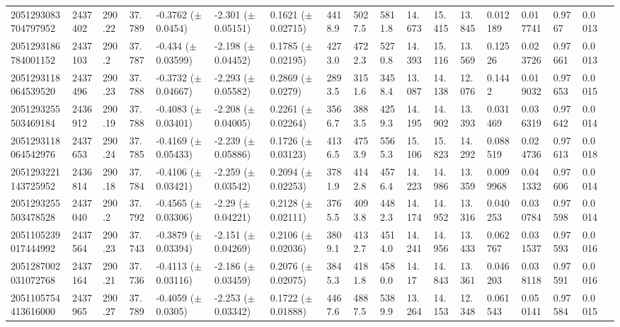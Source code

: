 \begin{sidewaystable}[htbp]
{\begin{tabular}{llllllllllllllllll}
            2051293083704797952 & 2437402 & 290.22 & 37.789 & -0.3762 ($\pm$ 0.0454) & -2.301 ($\pm$ 0.05151) & 0.1621 ($\pm$ 0.02715) & 4418.9 & 5027.5 & 5811.8 & 14.673 & 15.415 & 13.845 & 0.012189 & 0.017741 & 0.9767 & 0.0013 & \\
            2051293186784001152 & 2437103 & 290.2 & 37.787 & -0.434 ($\pm$ 0.03599) & -2.198 ($\pm$ 0.04452) & 0.1785 ($\pm$ 0.02195) & 4273.0 & 4722.3 & 5270.8 & 14.393 & 15.116 & 13.569 & 0.12526 & 0.023726 & 0.97661 & 0.0013 & \\
            2051293118064539520 & 2437496 & 290.23 & 37.788 & -0.3732 ($\pm$ 0.04667) & -2.293 ($\pm$ 0.05582) & 0.2869 ($\pm$ 0.0279) & 2893.5 & 3151.6 & 3458.4 & 13.087 & 14.138 & 12.076 & 0.1442 & 0.019032 & 0.97653 & 0.0015 & \\
            2051293255503469184 & 2436912 & 290.19 & 37.788 & -0.4083 ($\pm$ 0.03401) & -2.208 ($\pm$ 0.04005) & 0.2261 ($\pm$ 0.02264) & 3566.7 & 3883.5 & 4259.3 & 14.195 & 14.902 & 13.393 & 0.031469 & 0.036319 & 0.97642 & 0.0014 & \\
            2051293118064542976 & 2437653 & 290.24 & 37.785 & -0.4169 ($\pm$ 0.05433) & -2.239 ($\pm$ 0.05886) & 0.1726 ($\pm$ 0.03123) & 4136.5 & 4753.9 & 5565.3 & 15.106 & 15.823 & 14.292 & 0.088519 & 0.024736 & 0.97613 & 0.0018 & \\
            2051293221143725952 & 2436814 & 290.18 & 37.784 & -0.4106 ($\pm$ 0.03421) & -2.259 ($\pm$ 0.03542) & 0.2094 ($\pm$ 0.02253) & 3781.9 & 4142.8 & 4576.4 & 14.223 & 14.986 & 13.359 & 0.0099968 & 0.041332 & 0.97606 & 0.0014 & \\
            2051293255503478528 & 2437040 & 290.2 & 37.792 & -0.4565 ($\pm$ 0.03306) & -2.29 ($\pm$ 0.04221) & 0.2128 ($\pm$ 0.02111) & 3765.5 & 4093.8 & 4482.3 & 14.174 & 14.952 & 13.316 & 0.040253 & 0.030784 & 0.97598 & 0.0014 & \\
            2051105239017444992 & 2437564 & 290.23 & 37.743 & -0.3879 ($\pm$ 0.03394) & -2.151 ($\pm$ 0.04269) & 0.2106 ($\pm$ 0.02036) & 3809.1 & 4132.7 & 4514.0 & 14.241 & 14.956 & 13.433 & 0.062767 & 0.031537 & 0.97593 & 0.0016 & \\
            2051287002031072768 & 2437164 & 290.21 & 37.736 & -0.4113 ($\pm$ 0.03116) & -2.186 ($\pm$ 0.03459) & 0.2076 ($\pm$ 0.02075) & 3845.3 & 4181.8 & 4580.0 & 14.17 & 14.843 & 13.361 & 0.046203 & 0.038118 & 0.97591 & 0.0016 & \\
            2051105754413616000 & 2437965 & 290.27 & 37.789 & -0.4059 ($\pm$ 0.0305) & -2.253 ($\pm$ 0.03342) & 0.1722 ($\pm$ 0.01888) & 4467.6 & 4887.5 & 5389.9 & 13.264 & 14.153 & 12.348 & 0.061543 & 0.050141 & 0.97584 & 0.0015 & \\

\end{tabular}}
\end{sidewaystable}
